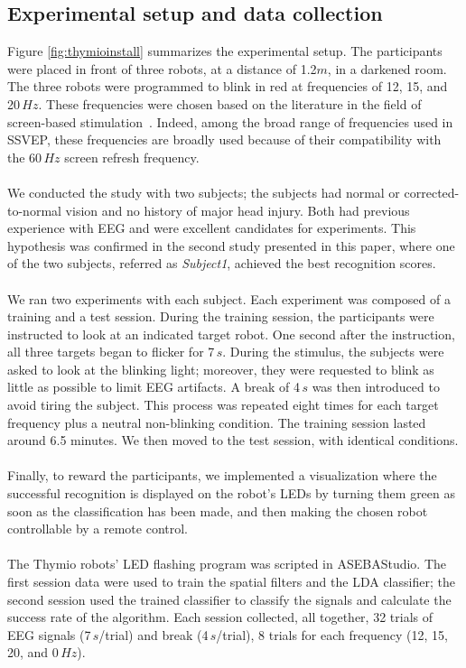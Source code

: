 \documentclass[smallextended]{svjour3}
\begin{document}
\subsection{Experimental setup and data collection}
Figure \ref{fig:thymioinstall} summarizes the experimental setup. The participants were placed in front of three robots, at a distance of 1.2$m$, in a darkened room. The three robots were programmed to blink in red at frequencies of 12, 15, and 20\,$Hz$. These frequencies were chosen based on the literature in the field of screen-based stimulation~\cite{Zhu2010}.
Indeed, among the broad range of frequencies used in SSVEP, these frequencies are broadly used because of their compatibility with the 60\,$Hz$ screen refresh frequency.\\
\\
We conducted the study with two subjects; the subjects had normal or corrected-to-normal vision and no history of major head injury. 
Both had previous experience with EEG and were excellent candidates for experiments. 
This hypothesis was confirmed in the second study presented in this paper, where one of the two subjects, referred as \textit{Subject1}, achieved the best recognition scores. \\
\\
We ran two experiments with each subject. Each experiment was composed of a training and a test session. During the training session, the participants were instructed to look at an indicated target robot. 
One second after the instruction, all three targets began to flicker for 7\,$s$. During the stimulus, the subjects were asked to look at the blinking light; moreover, they were requested to blink as little as possible to limit EEG artifacts. 
A break of 4\,$s$ was then introduced to avoid tiring the subject. 
This process was repeated eight times for each target frequency plus a neutral non-blinking condition. 
The training session lasted around 6.5 minutes. We then moved to the test session, with identical conditions.\\
\\
Finally, to reward the participants, we implemented a visualization where the successful recognition is displayed on the robot's LEDs by turning them green as soon as the classification has been made, and then making the chosen robot controllable by a remote control.\\
\\
The Thymio robots' LED flashing program was scripted in ASEBAStudio. The first session data were used to train the spatial filters and the LDA classifier; the second session used the trained classifier to classify the signals and calculate the success rate of the algorithm. Each session collected, all together, 32 trials of EEG signals (7\,$s$/trial) and break (4\,$s$/trial), 8 trials for each frequency (12, 15, 20, and 0\,$Hz$). 
\end{document}
